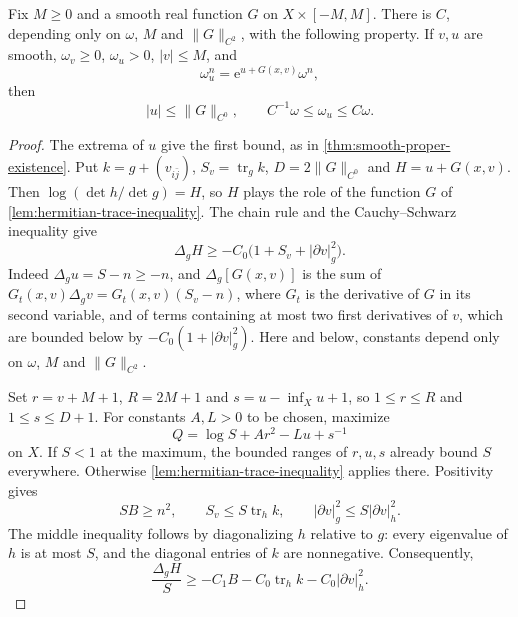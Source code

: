 \begin{lemma}\label{lem:prescribed-potential-trace}
Fix $M\geq0$ and a smooth real function $G$ on $X\times[-M,M]$.
There is $C$, depending only on $\omega$, $M$ and $\|G\|_{C^2}$, with the following property. If $v,u$ are smooth, $\omega_v\geq0$, $\omega_u>0$, $|v|\leq M$, and
\[
 \omega_u^n=\mathrm e^{u+G(x,v)}\omega^n,
\]
then
\[
 |u|\leq\|G\|_{C^0},\qquad C^{-1}\omega\leq\omega_u\leq C\omega.
\]
\end{lemma}
\begin{proof}
The extrema of $u$ give the first bound, as in \cref{thm:smooth-proper-existence}.
Put $k=g+(v_{i\bar j})$, $S_v=\operatorname{tr}_gk$, $D=2\|G\|_{C^0}$ and $H=u+G(x,v)$.
Then $\log(\det h/\det g)=H$, so $H$ plays the role of the function $G$ of \cref{lem:hermitian-trace-inequality}. The chain rule and the Cauchy--Schwarz inequality give
\[
 \Delta_gH\geq-C_0\bigl(1+S_v+|\partial v|_g^2\bigr).
\]
Indeed $\Delta_gu=S-n\geq-n$, and $\Delta_g[G(x,v)]$ is the sum of $G_t(x,v)\Delta_gv=G_t(x,v)(S_v-n)$, where $G_t$ is the derivative of $G$ in its second variable, and of terms containing at most two first derivatives of $v$, which are bounded below by $-C_0(1+|\partial v|_g^2)$.
Here and below, constants depend only on $\omega$, $M$ and $\|G\|_{C^2}$.

Set $r=v+M+1$, $R=2M+1$ and $s=u-\inf_Xu+1$, so
$1\leq r\leq R$ and $1\leq s\leq D+1$. For constants $A,L>0$ to be chosen, maximize
\[
 Q=\log S+Ar^2-Lu+s^{-1}
\]
on $X$. If $S<1$ at the maximum, the bounded ranges of $r,u,s$ already bound $S$ everywhere. Otherwise \cref{lem:hermitian-trace-inequality} applies there. Positivity gives
\[
 SB\geq n^2,\qquad S_v\leq S\operatorname{tr}_hk,
 \qquad |\partial v|_g^2\leq S|\partial v|_h^2.
\]
The middle inequality follows by diagonalizing $h$ relative to $g$: every eigenvalue of $h$ is at most $S$, and the diagonal entries of $k$ are nonnegative.
Consequently,
\[
 \frac{\Delta_gH}{S}
 \geq-C_1 B-C_0\operatorname{tr}_hk-C_0|\partial v|_h^2.
\]


\end{proof}

